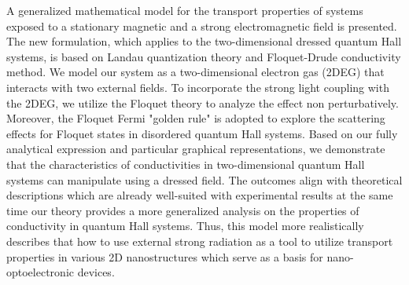 A generalized mathematical model for the transport properties of systems exposed to a stationary magnetic and a strong electromagnetic field is presented. The new formulation, which applies to the two-dimensional dressed quantum Hall systems, is based on Landau quantization theory and Floquet-Drude conductivity method. We model our system as a two-dimensional electron gas (2DEG) that interacts with two external fields. To incorporate the strong light coupling with the 2DEG, we utilize the Floquet theory to analyze the effect non perturbatively. Moreover, the Floquet Fermi "golden rule" is adopted to explore the scattering effects for Floquet states in disordered quantum Hall systems. Based on our fully analytical expression and particular graphical representations, we demonstrate
that the characteristics of conductivities in two-dimensional quantum Hall systems can manipulate using a dressed field. The outcomes align with theoretical descriptions which are already well-suited with experimental results at the same time our theory provides a more generalized analysis on the properties of conductivity in quantum Hall systems. Thus, this model more realistically describes that how to use external strong radiation as a tool to utilize transport properties in various 2D nanostructures which serve as a basis for nano-optoelectronic devices.
